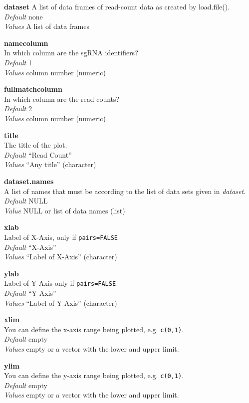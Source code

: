 \documentclass[]{article}
\begin{document}
\textbf{dataset} A list of data frames of read-count data as created by
load.file().\\
\emph{Default} none\\
\emph{Values} A list of data frames

\textbf{namecolumn}\\
In which column are the sgRNA identifiers?\\
\emph{Default} 1\\
\emph{Values} column number (numeric)

\textbf{fullmatchcolumn}\\
In which column are the read counts?\\
\emph{Default} 2\\
\emph{Values} column number (numeric)

\textbf{title}\\
The title of the plot.\\
\emph{Default} ``Read Count''\\
\emph{Values} ``Any title'' (character)

\textbf{dataset.names}\\
A list of names that must be according to the list of data sets given in
\emph{dataset}.\\
\emph{Default} NULL\\
\emph{Value} NULL or list of data names (list)

\textbf{xlab}\\
Label of X-Axis, only if \texttt{pairs=FALSE}\\
\emph{Default} ``X-Axis''\\
\emph{Values} ``Label of X-Axis'' (character)

\textbf{ylab}\\
Label of Y-Axis only if \texttt{pairs=FALSE}\\
\emph{Default} ``Y-Axis''\\
\emph{Values} ``Label of Y-Axis'' (character)

\textbf{xlim}\\
You can define the x-axis range being plotted, e.g. \texttt{c(0,1)}.\\
\emph{Default} empty\\
\emph{Values} empty or a vector with the lower and upper limit.

\textbf{ylim}\\
You can define the y-axis range being plotted, e.g. \texttt{c(0,1)}.\\
\emph{Default} empty\\
\emph{Values} empty or a vector with the lower and upper limit.
\end{document}
